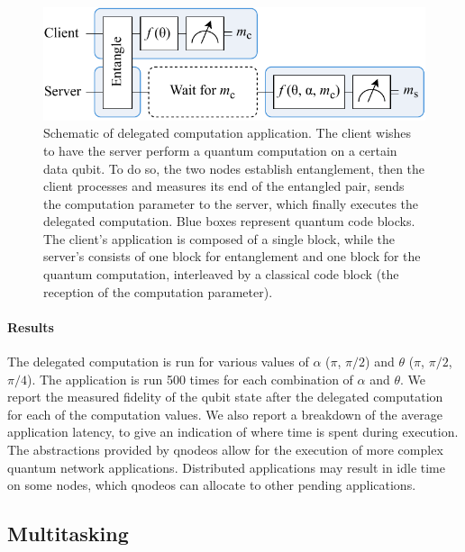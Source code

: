 \begin{figure}[t]
    \centering
    \includegraphics[width=0.6\linewidth]{figures/del-comp.pdf}
    \caption{
        Schematic of delegated computation application. The client wishes to have the server perform
        a quantum computation on a certain data qubit. To do so, the two nodes establish
        entanglement, then the client processes and measures its end of the entangled pair, sends
        the computation parameter to the server, which finally executes the delegated computation.
        Blue boxes represent quantum code blocks. The client's application is composed of a single
        block, while the server's consists of one block for entanglement and one block for the
        quantum computation, interleaved by a classical code block (the reception of the computation
        parameter).
    }
    \label{fig:del-comp}
\end{figure}

\paragraph{Results}

The delegated computation is run for various values of $\alpha$ ($\pi$, $\pi/2$) and $\theta$
($\pi$, $\pi/2$, $\pi/4$). The application is run \num{500} times for each combination of $\alpha$
and $\theta$. We report the measured fidelity of the qubit state after the delegated computation for
each of the computation values. We also report a breakdown of the average application latency, to
give an indication of where time is spent during execution.  The
abstractions provided by \acrshort{qnodeos} allow for the execution of more complex quantum network
applications. Distributed applications may result in idle time on some nodes, which
\acrshort{qnodeos} can allocate to other pending applications.

\subsection{Multitasking}

